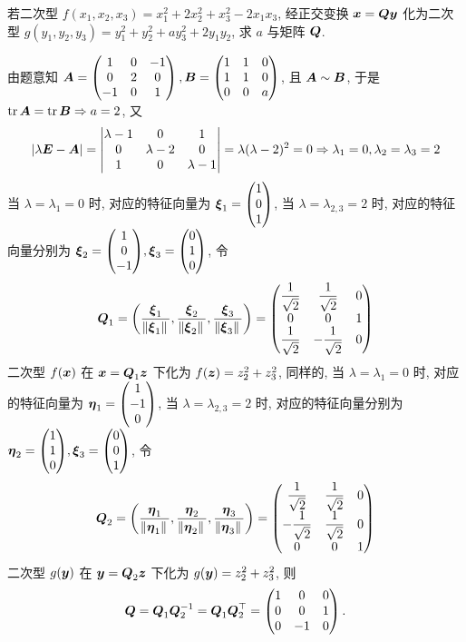 \begin{example}
    若二次型 $f(x_1, x_2, x_3)=x_1^2+2x_2^2+x_3^2-2x_1x_3$, 经正交变换 $\vb*{x}=\vb*{Qy}$ 化为二次型 $g(y_1, y_2, y_3)=y_1^2+y_2^2+ay_3^2+2y_1y_2$, 求 $a$ 与矩阵 $\vb*{Q}$.
\end{example}
\begin{solution}
    由题意知 $\vb*{A}=\begin{pmatrix} 1 & 0 & -1 \\ 0 & 2 & 0 \\ -1 & 0 & 1 \\\end{pmatrix}, \vb*{B}=\begin{pmatrix} 1 & 1 & 0 \\ 1 & 1 & 0 \\ 0 & 0 & a \\\end{pmatrix}$, 且 $\vb*{A}\sim \vb*{B}$, 于是 $\tr\vb*{A}=\tr\vb*{B}\Rightarrow a=2$, 又
    $$
        |\lambda\vb*{E}-\vb*{A}|=\mqty|\lambda-1 & 0 & 1 \\ 0 & \lambda-2 & 0 \\ 1 & 0 & \lambda-1 |=\lambda(\lambda-2)^2=0\Rightarrow \lambda_1=0,\lambda_2=\lambda_3=2
    $$
    当 $\lambda=\lambda_1=0$ 时, 对应的特征向量为 $\vb*{\xi}_1=\mqty(1\\0\\1)$, 当 $\lambda=\lambda_{2,3}=2$ 时, 对应的特征向量分别为
    $\vb*{\xi}_2=\mqty(1\\0\\-1),\vb*{\xi}_3=\mqty(0\\1\\0)$, 令 $$\vb*{Q}_1=\qty(\dfrac{\vb*{\xi}_1}{\norm*{\vb*{\xi}_1}},\dfrac{\vb*{\xi}_2}{\norm*{\vb*{\xi}_2}},\dfrac{\vb*{\xi}_3}{\norm*{\vb*{\xi}_3}})=\mqty(\dfrac{1}{\sqrt{2}}&\dfrac{1}{\sqrt{2}}&0\\ 0&0&1\\ \dfrac{1}{\sqrt{2}}&-\dfrac{1}{\sqrt{2}}&0)$$
    二次型 $f(\vb*{x})$ 在 $\vb*{x}=\vb*{Q}_1\vb*{z}$ 下化为 $f(\vb*{z})=z_2^2+z_3^2$, 同样的, 当 $\lambda=\lambda_1=0$ 时, 对应的特征向量为 $\vb*{\eta}_1=\mqty(1\\-1\\0)$, 当 $\lambda=\lambda_{2,3}=2$ 时, 对应的特征向量分别为 $\vb*{\eta}_2=\mqty(1\\1\\0),\vb*{\xi}_3=\mqty(0\\0\\1)$, 
    令 $$\vb*{Q}_2=\qty(\dfrac{\vb*{\eta}_1}{\norm*{\vb*{\eta}_1}},\dfrac{\vb*{\eta}_2}{\norm*{\vb*{\eta}_2}},\dfrac{\vb*{\eta}_3}{\norm*{\vb*{\eta}_3}})=\mqty(\dfrac{1}{\sqrt{2}}&\dfrac{1}{\sqrt{2}}&0\\[6pt]-\dfrac{1}{\sqrt{2}}&\dfrac{1}{\sqrt{2}}&0\\0&0&1)$$
    二次型 $g(\vb*{y})$ 在 $\vb*{y}=\vb*{Q}_2\vb*{z}$ 下化为 $g(\vb*{y})=z_2^2+z_3^2$, 则
    $$\vb*{Q}=\vb*{Q}_1\vb*{Q}_2^{-1}=\vb*{Q}_1\vb*{Q}_2^\top=\begin{pmatrix} 1 & 0 & 0 \\ 0 & 0 & 1 \\ 0 & -1 & 0 \\\end{pmatrix}.$$
\end{solution}

